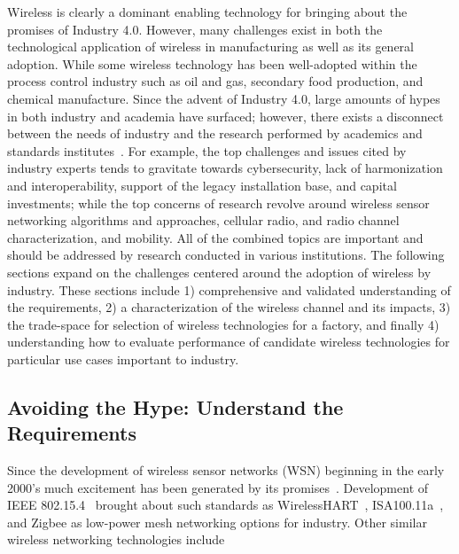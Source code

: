 {Wireless is clearly a dominant enabling technology for bringing about the promises of Industry 4.0.  However, many challenges exist in both the technological application of wireless in manufacturing as well as its general adoption. While some wireless technology has been well-adopted within the process control industry such as oil and gas, secondary food production, and chemical manufacture.  Since the advent of Industry 4.0, large amounts of hypes in both industry and academia have surfaced; however, there exists a disconnect between the needs of industry and the research performed by academics and standards institutes~\cite{Martinez2019}.  For example, the top challenges and issues cited by industry experts tends to gravitate towards cybersecurity, lack of harmonization and interoperability, support of the legacy installation base, and capital investments; while the top concerns of research revolve around wireless sensor networking algorithms and approaches, cellular radio, and radio channel characterization, and mobility.  All of the combined topics are important and should be addressed by research conducted in various institutions.  The following sections expand on the challenges centered around the adoption of wireless by industry.  These sections include 1) comprehensive and validated understanding of the requirements, 2) a characterization of the wireless channel and its impacts, 3) the trade-space for selection of wireless technologies for a factory, and finally 4) understanding how to evaluate performance of candidate wireless technologies for particular use cases important to industry.


\subsection{Avoiding the Hype: Understand the Requirements}

Since the development of wireless sensor networks (WSN) beginning in the early 2000's much excitement has been generated by its promises~\cite{OnWorld2014}.   Development of IEEE 802.15.4~\cite{wiki:ieee802.15.4} brought about such standards as WirelessHART~\cite{Song2008}, ISA100.11a~\cite{ISA100.11a}, and Zigbee as low-power mesh networking options for industry.  Other similar wireless networking technologies include 

}
